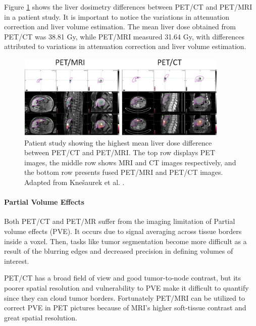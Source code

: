 \documentclass[11pt]{article} %
\begin{document}
\begin{multicols}{2}
Figure \ref{fig:patient_liver_dose} shows the liver dosimetry differences between PET/CT and PET/MRI in a patient study. It is important to notice the variations in attenuation correction and liver volume estimation. The mean liver dose obtained from PET/CT was 38.81 Gy, while PET/MRI measured 31.64 Gy, with differences attributed to variations in attenuation correction and liver volume estimation.

\begin{figure}[ht]
\centering
\includegraphics[width=0.9\textwidth]{assets/Liver_Dosimetry_Differences.png} 
\caption{Patient study showing the highest mean liver dose difference between PET/CT and PET/MRI. The top row displays PET images, the middle row shows MRI and CT images respectively, and the bottom row presents fused PET/MRI and PET/CT images. Adapted from Knešaurek et al. \cite{knesaurek2018}.}
\label{fig:patient_liver_dose}
\end{figure}

\paragraph{Partial Volume Effects}

Both PET/CT and PET/MR suffer from the imaging limitation of Partial volume effects (PVE). It occurs due to signal averaging across tissue borders inside a voxel. Then, tasks like tumor segmentation become more difficult as a result of the blurring edges and decreased precision in defining volumes of interest. 

PET/CT has a broad field of view and good tumor-to-node contrast, but its poorer spatial resolution and vulnerability to PVE make it difficult to quantify since they can cloud tumor borders. Fortunately PET/MRI can be utilized to correct PVE in PET pictures because of MRI's higher soft-tissue contrast and great spatial resolution. 


\end{multicols}
\end{document}
